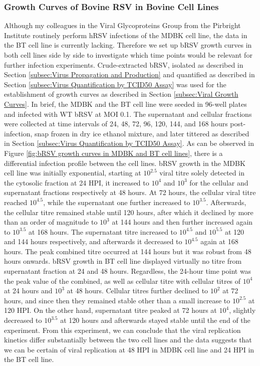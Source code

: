 \subsubsection{Growth Curves of Bovine RSV in Bovine Cell Lines} \label{Growth Curves of Bovine RSV in Bovine Cell Lines}
Although my colleagues in the Viral Glycoproteins Group from the Pirbright Institute routinely perform hRSV infections of the MDBK cell line, the data in the BT cell line is currently lacking. Therefore we set up bRSV growth curves in both cell lines side by side to investigate which time points would be relevant for further infection experiments. Crude-extracted bRSV, isolated as described in Section \ref{subsec:Virus Propagation and Production} and quantified as described in Section \ref{subsec:Virus Quantification by TCID50 Assay} was used for the establishment of growth curves as described in Section \ref{subsec:Viral Growth Curves}. In brief, the MDBK and the BT cell line were seeded in 96-well plates and infected with WT bRSV at MOI 0.1. The supernatant and cellular fractions were collected at time intervals of 24, 48, 72, 96, 120, 144, and 168 hours post-infection, snap frozen in dry ice ethanol mixture, and later tittered as described in Section \ref{subsec:Virus Quantification by TCID50 Assay}. As can be observed in Figure \ref{fig:bRSV growth curves in MDBK and BT cell lines}, there is a differential infection profile between the cell lines. bRSV growth in the MDBK cell line was initially exponential, starting at \(10^{2.5}\) viral titre solely detected in the cytosolic fraction at 24 HPI, it increased to \(10^{4}\) and \(10^{3}\) for the cellular and supernatant fractions respectively at 48 hours. At 72 hours, the cellular viral titre reached \(10^{4.5}\), while the supernatant one further increased to \(10^{3.5}\). Afterwards, the cellular titre remained stable until 120 hours, after which it declined by more than an order of magnitude to \(10^{3}\) at 144 hours and then further increased again to \(10^{3.5}\) at 168 hours. The supernatant titre increased to \(10^{4.5}\) and \(10^{5.5}\) at 120 and 144 hours respectively, and afterwards it decreased to \(10^{4.5}\) again at 168 hours. The peak combined titre occurred at 144 hours but it was robust from 48 hours onwards. bRSV growth in BT cell line displayed virtually no titre from supernatant fraction at 24 and 48 hours. Regardless, the 24-hour time point was the peak value of the combined, as well as cellular titre with cellular titres of \(10^{4}\) at 24 hours and \(10^{3}\) at 48 hours. Cellular titres further declined to \(10^{2}\) at 72 hours, and since then they remained stable other than a small increase to \(10^{2.5}\) at 120 HPI. On the other hand, supernatant titre peaked at 72 hours at \(10^{4}\), slightly decreased to \(10^{3.5}\) at 120 hours and afterwards stayed stable until the end of the experiment. From this experiment, we can conclude that the viral replication kinetics differ substantially between the two cell lines and the data suggests that we can be certain of viral replication at 48 HPI in MDBK cell line and 24 HPI in the BT cell line.

